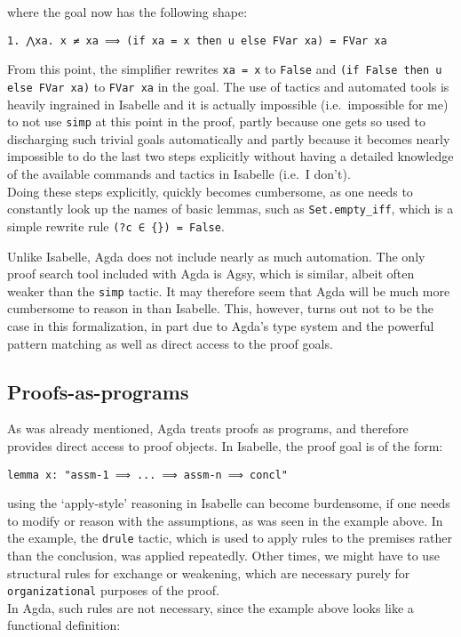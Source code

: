 \documentclass[a4paper, 12pt, twoside]{style/ociamthesis}
\let\OldTexttt\texttt
\renewcommand{\texttt}[1]{\small\OldTexttt{#1}}
\begin{document}
where the goal now has the following shape:

\begin{verbatim}
1. ⋀xa. x ≠ xa ⟹ (if xa = x then u else FVar xa) = FVar xa
\end{verbatim}

From this point, the simplifier rewrites \texttt{xa = x} to
\texttt{False} and \texttt{(if False then u else FVar xa)} to
\texttt{FVar xa} in the goal. The use of tactics and automated tools is
heavily ingrained in Isabelle and it is actually impossible
(i.e.~impossible for me) to not use \texttt{simp} at this point in the
proof, partly because one gets so used to discharging such trivial goals
automatically and partly because it becomes nearly impossible to do the
last two steps explicitly without having a detailed knowledge of the
available commands and tactics in Isabelle (i.e.~I don't).\\
Doing these steps explicitly, quickly becomes cumbersome, as one needs
to constantly look up the names of basic lemmas, such as
\texttt{Set.empty\_iff}, which is a simple rewrite rule
\texttt{(?c ∈ \{\}) = False}.

Unlike Isabelle, Agda does not include nearly as much automation. The
only proof search tool included with Agda is Agsy, which is similar,
albeit often weaker than the \texttt{simp} tactic. It may therefore seem
that Agda will be much more cumbersome to reason in than Isabelle. This,
however, turns out not to be the case in this formalization, in part due
to Agda's type system and the powerful pattern matching as well as
direct access to the proof goals.

\subsection{Proofs-as-programs}\label{proofs-as-programs}

As was already mentioned, Agda treats proofs as programs, and therefore
provides direct access to proof objects. In Isabelle, the proof goal is
of the form:

\begin{verbatim}
lemma x: "assm-1 ⟹ ... ⟹ assm-n ⟹ concl"
\end{verbatim}

using the `apply-style' reasoning in Isabelle can become burdensome, if
one needs to modify or reason with the assumptions, as was seen in the
example above. In the example, the \texttt{drule} tactic, which is used
to apply rules to the premises rather than the conclusion, was applied
repeatedly. Other times, we might have to use structural rules for
exchange or weakening, which are necessary purely for
\texttt{organizational} purposes of the proof.\\
In Agda, such rules are not necessary, since the example above looks
like a functional definition:
\end{document}
